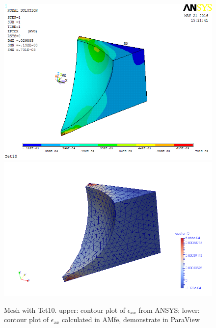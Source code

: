 \begin{figure}[htbp]
	\begin{center}
		\includegraphics[width=13cm,clip]{Tet10_Exx.png} 		
		\includegraphics[width=13cm,clip]{Tet10_Exx_P.png} 		
		\caption{Mesh with Tet10. upper: contour plot of $\epsilon_{xx}$ from ANSYS; lower: contour plot of $\epsilon_{xx}$ calculated in AMfe, demonstrate in ParaView} \label{fig: Tet10_Exx}
	\end{center}
\end{figure}
\clearpage 

